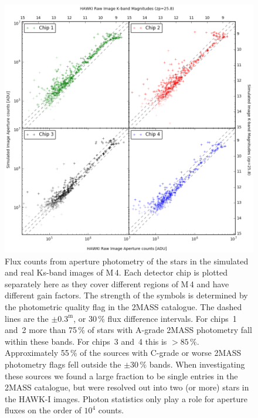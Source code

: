 \begin{figure}

    \centering
    \includegraphics[width=\textwidth]{images/HAWKI_vs_HAWKado_couts_and_mags.png}
    
    \caption{Flux counts from aperture photometry of the stars in the simulated and real Ks-band images of M\,4. Each detector chip is plotted separately here as they cover different regions of M\,4 and have different gain factors. The strength of the symbols is determined by the photometric quality flag in the 2MASS catalogue. The dashed lines are the $\pm 0.3^\mathrm{m}$, or 30\,\% flux difference intervals. For chips~1 and~2  more than 75\,\% of stars with A-grade 2MASS photometry fall within these bands. For chips~3 and~4 this is $>85\,\%$. Approximately 55\,\% of the sources with C-grade or worse 2MASS photometry flags fell outside the $\pm 30\,\%$ bands. When investigating these sources we found a large fraction to be single entries in the 2MASS catalogue, but were resolved out into two (or more) stars in the HAWK-I images. Photon statistics only play a role for aperture fluxes on the order of $10^{4}$ counts.}
    \label{fig:HAWKI_hawkado_flux_comparison}
    
\end{figure}

